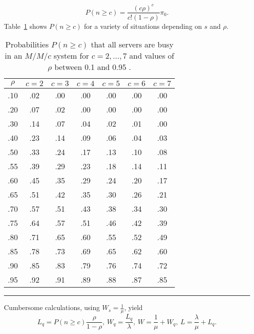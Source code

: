 $$ P( n \geq c) =  \frac{\left(c \rho\right)^{c}}{c! \left(1-\rho\right)} \pi_{0}.$$ 
Table~\ref{tab:pns} shows $P( n \geq c)$ for a variety of situations depending on $s$ and $\rho$.  
\begin{table}[!t]
\centering
\begin{tabular}{ccccccc}
\hline
$\rho$ & $c=2$ & $c=3$ & $c=4$ & $c=5$ & $c=6$ & $c=7$ \\
 \hline
.10& .02& .00& .00& .00& .00& .00 \\
.20& .07& .02& .00& .00& .00& .00 \\
.30& .14& .07& .04& .02& .01& .00 \\
.40& .23& .14& .09& .06& .04& .03 \\
.50& .33& .24& .17& .13& .10& .08 \\
.55& .39& .29& .23& .18& .14& .11 \\
.60& .45& .35& .29& .24& .20& .17 \\
.65& .51& .42& .35& .30& .26& .21 \\
.70& .57& .51& .43& .38& .34& .30 \\
.75& .64& .57& .51& .46& .42& .39 \\
.80& .71& .65& .60& .55& .52& .49 \\
.85& .78& .73& .69& .65& .62& .60 \\
.90& .85& .83& .79& .76& .74& .72 \\
.95& .92& .91& .89& .88& .87& .85 \\
\hline
\end{tabular}
\caption{\small Probabilities $P(n\geq c)$ that all servers are busy in an $M/M/c$ system for $c=2,\ldots, 7$ and values of $\rho$ between 0.1 and 0.95 \cite[p.1088]{QS_W}.}\label{tab:pns}\hrule
\end{table}\afterpage{\FloatBarrier}
Cumbersome calculations, using $W_{s} = \frac{1}{\mu}$, yield $$ L_{q} = P( n \geq c) \frac{\rho}{1-\rho}, \ 
W_{q} = \frac{L_{q}}{\lambda}, \ 
W = \frac{1}{\mu} + W_{q}, \ 
 L = \frac{\lambda}{\mu} + L_{q}.$$
\newpage\noindent 
